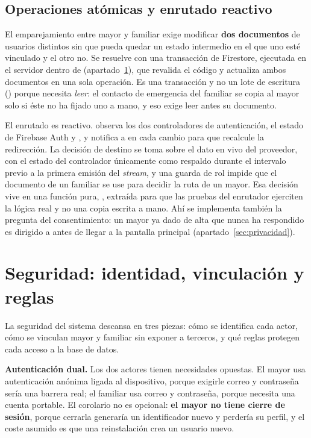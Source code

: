 \subsection{Operaciones atómicas y enrutado reactivo}

El emparejamiento entre mayor y familiar exige modificar \textbf{dos documentos} de usuarios distintos sin
que pueda quedar un estado intermedio en el que uno esté vinculado y el otro no. Se resuelve con una
transacción de Firestore, ejecutada en el servidor dentro de 
(apartado~\ref{sec:seguridad}), que revalida el código y actualiza ambos documentos en una sola operación.
Es una transacción y no un lote de escritura () porque necesita \emph{leer}: el contacto de
emergencia del familiar se copia al mayor solo si éste no ha fijado uno a mano, y eso exige leer antes su
documento.

El enrutado es reactivo.  observa los dos controladores de autenticación, el estado de
Firebase Auth y , y notifica a  en cada cambio para que
recalcule la redirección. La decisión de destino se toma sobre el dato en vivo del proveedor, con el estado
del controlador únicamente como respaldo durante el intervalo previo a la primera emisión del \emph{stream},
y una guarda de rol impide que el documento de un familiar se use para decidir la ruta de un mayor. Esa
decisión vive en una función pura, , extraída para que las pruebas del enrutador
ejerciten la lógica real y no una copia escrita a mano. Ahí se implementa también la pregunta del
consentimiento: un mayor ya dado de alta que nunca ha respondido es dirigido a  antes de
llegar a la pantalla principal (apartado~\ref{sec:privacidad}).

\section{Seguridad: identidad, vinculación y reglas}
\label{sec:seguridad}

La seguridad del sistema descansa en tres piezas: cómo se identifica cada actor, cómo se vinculan mayor y
familiar sin exponer a terceros, y qué reglas protegen cada acceso a la base de datos.

\textbf{Autenticación dual.} Los dos actores tienen necesidades opuestas. El mayor usa autenticación
anónima ligada al dispositivo, porque exigirle correo y contraseña sería una barrera real; el familiar usa
correo y contraseña, porque necesita una cuenta portable. El corolario no es opcional: \textbf{el mayor no
tiene cierre de sesión}, porque cerrarla generaría un identificador nuevo y perdería su perfil, y el coste
asumido es que una reinstalación crea un usuario nuevo.

